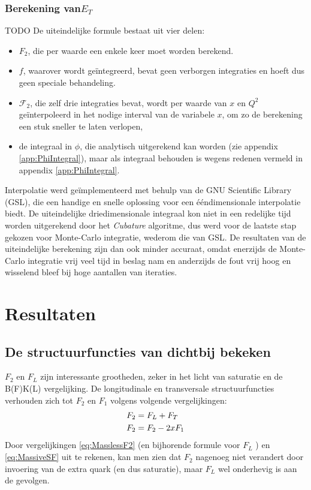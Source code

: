 \documentclass[a4paper,11pt]{article}
\numberwithin{equation}{section} %
\begin{document}
  \subsubsection{Berekening van$E_T$}
TODO
De uiteindelijke formule bestaat uit vier delen:
\begin{itemize}
  \item $F_2$, die per waarde een enkele keer moet worden berekend.
  \item $f$, waarover wordt geïntegreerd, bevat geen verborgen integraties en hoeft dus geen speciale behandeling.
  \item $\mathcal{F}_2$, die zelf drie integraties bevat, wordt per waarde van $x$ en $Q^2$ geïnterpoleerd in het nodige interval van de variabele $x$, om zo de berekening een stuk sneller te laten verlopen,
  \item de integraal in $\phi$, die analytisch uitgerekend kan worden (zie appendix \ref{app:PhiIntegral}), maar als integraal behouden is wegens redenen vermeld in appendix \ref{app:PhiIntegral}.
\end{itemize}

Interpolatie werd geïmplementeerd met behulp van de GNU Scientific Library (GSL), die een handige en snelle oplossing voor een ééndimensionale interpolatie biedt.
De uiteindelijke driedimensionale integraal kon niet in een redelijke tijd worden uitgerekend door het \textit{Cubature} algoritme, dus werd voor de laatste stap gekozen voor Monte-Carlo integratie, wederom die van GSL.
De resultaten van de uiteindelijke berekening zijn dan ook minder accuraat, omdat enerzijds de Monte-Carlo integratie vrij veel tijd in beslag nam en anderzijds de fout vrij hoog en wisselend bleef bij hoge aantallen van iteraties.

\section{Resultaten}
    \subsection{De structuurfuncties van dichtbij bekeken} \label{sec:ResSF}
$F_2$ en $F_L$ zijn interessante grootheden, zeker in het licht van saturatie en de B(F)K(L) vergelijking.
De longitudinale en transversale structuurfuncties verhouden zich tot $F_2$ en $F_1$ volgens volgende vergelijkingen:
\begin{align}
F_2 &= F_L + F_T \\
F_2 &= F_2 - 2xF_1 \notag
\end{align}
Door vergelijkingen \eqref{eq:MasslessF2} (en bijhorende formule voor $F_L$ \cite{Barone}) en \eqref{eq:MassiveSF} uit te rekenen, kan men zien dat $F_2$ nagenoeg niet verandert door invoering van de extra quark (en dus saturatie), maar $F_L$ wel onderhevig is aan de gevolgen.
\end{document}
